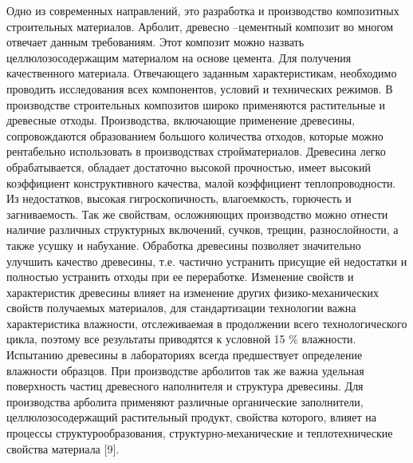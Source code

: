 \begin{multicols}{2}
Одно из современных направлений, это разработка и производство
композитных строительных материалов. Арболит, древесно --цементный
композит во многом отвечает данным требованиям. Этот композит можно
назвать целлюлозосодержащим материалом на основе цемента. Для получения
качественного материала. Отвечающего заданным характеристикам,
необходимо проводить исследования всех компонентов, условий и
технических режимов. В производстве строительных композитов широко
применяются растительные и древесные отходы. Производства, включающие
применение древесины, сопровождаются образованием большого количества
отходов, которые можно рентабельно использовать в производствах
стройматериалов. Древесина легко обрабатывается, обладает достаточно
высокой прочностью, имеет высокий коэффициент конструктивного качества,
малой коэффициент теплопроводности. Из недостатков, высокая
гигроскопичность, влагоемкость, горючесть и загниваемость. Так же
свойствам, осложняющих производство можно отнести наличие различных
структурных включений, сучков, трещин, разнослойности, а также усушку и
набухание. Обработка древесины позволяет значительно улучшить качество
древесины, т.е. частично устранить присущие ей недостатки и полностью
устранить отходы при ее переработке. Изменение свойств и характеристик
древесины влияет на изменение других физико-механических свойств
получаемых материалов, для стандартизации технологии важна
характеристика влажности, отслеживаемая в продолжении всего
технологического цикла, поэтому все результаты приводятся к условной 15
\% влажности. Испытанию древесины в лабораториях всегда предшествует
определение влажности образцов. При производстве арболитов так же важна
удельная поверхность частиц древесного наполнителя и структура
древесины. Для производства арболита применяют различные органические
заполнители, целлюлозосодержащий растительный продукт, свойства
которого, влияет на процессы структурообразования,
структурно-механические и теплотехнические свойства материала {[}9{]}.


\end{multicols}
